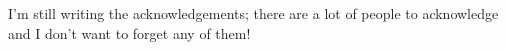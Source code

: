 
I'm still writing the acknowledgements; there are a lot of people to acknowledge and I don't want to forget any of them!